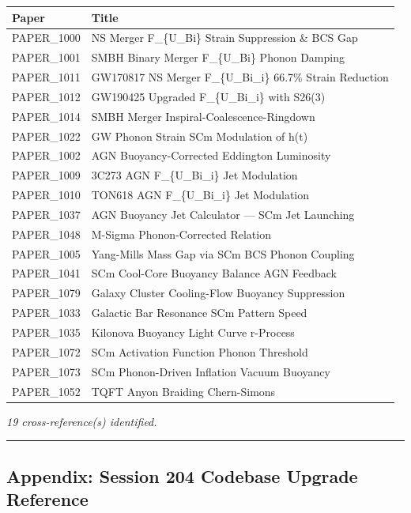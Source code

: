 \documentclass[
  11pt,
]{article}
\newcounter{none} %
\begin{document}
{\def\LTcaptype{none} %
\begin{longtable}[]{@{}ll@{}}
\toprule\noalign{}
Paper & Title \\
\midrule\noalign{}
\endhead
\bottomrule\noalign{}
\endlastfoot
PAPER\_1000 & NS Merger F\_\{U\_Bi\} Strain Suppression \& BCS Gap \\
PAPER\_1001 & SMBH Binary Merger F\_\{U\_Bi\} Phonon Damping \\
PAPER\_1011 & GW170817 NS Merger F\_\{U\_Bi\_i\} 66.7\% Strain
Reduction \\
PAPER\_1012 & GW190425 Upgraded F\_\{U\_Bi\_i\} with S26(3) \\
PAPER\_1014 & SMBH Merger Inspiral-Coalescence-Ringdown \\
PAPER\_1022 & GW Phonon Strain SCm Modulation of h(t) \\
PAPER\_1002 & AGN Buoyancy-Corrected Eddington Luminosity \\
PAPER\_1009 & 3C273 AGN F\_\{U\_Bi\_i\} Jet Modulation \\
PAPER\_1010 & TON618 AGN F\_\{U\_Bi\_i\} Jet Modulation \\
PAPER\_1037 & AGN Buoyancy Jet Calculator --- SCm Jet Launching \\
PAPER\_1048 & M-Sigma Phonon-Corrected Relation \\
PAPER\_1005 & Yang-Mills Mass Gap via SCm BCS Phonon Coupling \\
PAPER\_1041 & SCm Cool-Core Buoyancy Balance AGN Feedback \\
PAPER\_1079 & Galaxy Cluster Cooling-Flow Buoyancy Suppression \\
PAPER\_1033 & Galactic Bar Resonance SCm Pattern Speed \\
PAPER\_1035 & Kilonova Buoyancy Light Curve r-Process \\
PAPER\_1072 & SCm Activation Function Phonon Threshold \\
PAPER\_1073 & SCm Phonon-Driven Inflation Vacuum Buoyancy \\
PAPER\_1052 & TQFT Anyon Braiding Chern-Simons \\
\end{longtable}
}

\emph{19 cross-reference(s) identified.}

\begin{center}\rule{0.5\linewidth}{0.5pt}\end{center}

\subsection{Appendix: Session 204 Codebase Upgrade
Reference}\label{appendix-session-204-codebase-upgrade-reference}
\end{document}
